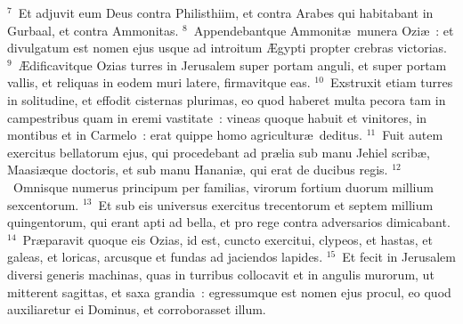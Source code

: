 ${}^{7}$~Et adjuvit eum Deus contra Philisthiim, et contra Arabes qui habitabant in Gurbaal, et contra Ammonitas.
${}^{8}$~Appendebantque Ammonit\ae\ munera Ozi\ae~: et divulgatum est nomen ejus usque ad introitum \AE gypti propter crebras victorias.
${}^{9}$~\AE dificavitque Ozias turres in Jerusalem super portam anguli, et super portam vallis, et reliquas in eodem muri latere, firmavitque eas.
${}^{10}$~Exstruxit etiam turres in solitudine, et effodit cisternas plurimas, eo quod haberet multa pecora tam in campestribus quam in eremi vastitate~: vineas quoque habuit et vinitores, in montibus et in Carmelo~: erat quippe homo agricultur\ae\ deditus.
${}^{11}$~Fuit autem exercitus bellatorum ejus, qui procedebant ad pr\ae lia sub manu Jehiel scrib\ae , Maasi\ae que doctoris, et sub manu Hanani\ae , qui erat de ducibus regis.
${}^{12}$~Omnisque numerus principum per familias, virorum fortium duorum millium sexcentorum.
${}^{13}$~Et sub eis universus exercitus trecentorum et septem millium quingentorum, qui erant apti ad bella, et pro rege contra adversarios dimicabant.
${}^{14}$~Pr\ae paravit quoque eis Ozias, id est, cuncto exercitui, clypeos, et hastas, et galeas, et loricas, arcusque et fundas ad jaciendos lapides.
${}^{15}$~Et fecit in Jerusalem diversi generis machinas, quas in turribus collocavit et in angulis murorum, ut mitterent sagittas, et saxa grandia~: egressumque est nomen ejus procul, eo quod auxiliaretur ei Dominus, et corroborasset illum.


